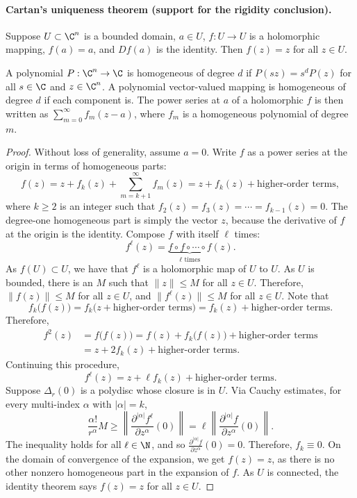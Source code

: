 
\paragraph{Cartan's uniqueness theorem (support for the rigidity conclusion).}
\begin{thm}[Cartan]
Suppose $U\subset\C^n$ is a bounded domain, $a\in U$, $f:U\to U$ is a holomorphic mapping, $f(a)=a$, and $Df(a)$ is the identity. Then $f(z)=z$ for all $z\in U$.
\end{thm}
A polynomial $P:\C^n\to\C$ is homogeneous of degree $d$ if $P(sz)=s^dP(z)$ for all $s\in\C$ and $z\in\C^n$. A polynomial vector-valued mapping is homogeneous of degree $d$ if each component is. The power series at $a$ of a holomorphic $f$ is then written as $\sum_{m=0}^\infty f_m(z-a)$, where $f_m$ is a homogeneous polynomial of degree $m$.
\begin{proof}
Without loss of generality, assume $a=0$. Write $f$ as a power series at the origin in terms of homogeneous parts:
\[
f(z)=z+f_k(z)+\sum_{m=k+1}^\infty f_m(z)=z+f_k(z)+\text{higher-order terms},
\]
where $k\geq2$ is an integer such that $f_2(z)=f_3(z)=\cdots=f_{k-1}(z)=0$. The degree-one homogeneous part is simply the vector $z$, because the derivative of $f$ at the origin is the identity. Compose $f$ with itself $\ell$ times:
\[f^\ell(z)=\underbrace{f\circ f\circ\cdots\circ f}_{\ell\text{ times}}(z).\]
As $f(U)\subset U$, we have that $f^\ell$ is a holomorphic map of $U$ to $U$. As $U$ is bounded, there is an $M$ such that $\|z\|\leq M$ for all $z\in U$. Therefore, $\|f(z)\|\leq M$ for all $z\in U$, and $\|f^\ell(z)\|\leq M$ for all $z\in U$. Note that
\[f_k\bigl(f(z)\bigr)=f_k\bigl(z+\text{higher-order terms}\bigr)=f_k(z)+\text{higher-order terms}.\]
Therefore,
\begin{align*}
f^2(z)&=f\bigl(f(z)\bigr)=f(z)+f_k\bigl(f(z)\bigr)+\text{higher-order terms}\\
&=z+2f_k(z)+\text{higher-order terms}.
\end{align*}
Continuing this procedure,
\[f^\ell(z)=z+\ell f_k(z)+\text{higher-order terms}.\]
Suppose $\Delta_r(0)$ is a polydisc whose closure is in $U$. Via Cauchy estimates, for every multi-index $\alpha$ with $|\alpha|=k$,
\[
\frac{\alpha!}{r^\alpha}M\geq\left\|\frac{\partial^{|\alpha|}f^\ell}{\partial z^\alpha}(0)\right\|=\ell\left\|\frac{\partial^{|\alpha|}f}{\partial z^\alpha}(0)\right\|.
\]
The inequality holds for all $\ell\in\N$, and so $\frac{\partial^{|\alpha|}f}{\partial z^\alpha}(0)=0$. Therefore, $f_k\equiv0$. On the domain of convergence of the expansion, we get $f(z)=z$, as there is no other nonzero homogeneous part in the expansion of $f$. As $U$ is connected, the identity theorem says $f(z)=z$ for all $z\in U$.
\end{proof}


